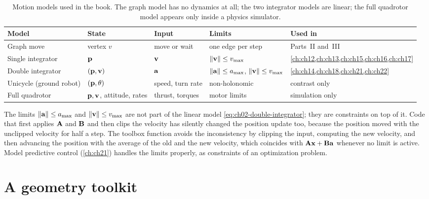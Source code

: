 \begin{table}[tb]
\centering\small
\caption{Motion models used in the book. The graph model has no dynamics at all; the two integrator models are linear; the full quadrotor model appears only inside a physics simulator.}
\label{tab:ch02-motion-models}
\begin{tabularx}{\textwidth}{@{}lllYY@{}}
\toprule
Model & State & Input & Limits & Used in\\
\midrule
Graph move & vertex $v$ & move or wait & one edge per step & Parts~II and~III\\
Single integrator & $\mathbf{p}$ & $\mathbf{v}$ & $\left\lVert \mathbf{v} \right\rVert\le v_{\max}$ & \cref{ch:ch12,ch:ch13,ch:ch15,ch:ch16,ch:ch17}\\
Double integrator & $(\mathbf{p},\mathbf{v})$ & $\mathbf{a}$ & $\left\lVert \mathbf{a} \right\rVert\le a_{\max}$, $\left\lVert \mathbf{v} \right\rVert\le v_{\max}$ & \cref{ch:ch14,ch:ch18,ch:ch21,ch:ch22}\\
Unicycle (ground robot) & $(\mathbf{p},\theta)$ & speed, turn rate & non-holonomic & contrast only\\
Full quadrotor & $\mathbf{p},\mathbf{v}$, attitude, rates & thrust, torques & motor limits & simulation only\\
\bottomrule
\end{tabularx}
\end{table}

\begin{pitfall}
The limits $\left\lVert \mathbf{a} \right\rVert\le a_{\max}$ and $\left\lVert \mathbf{v} \right\rVert\le v_{\max}$ are not part of the linear model \cref{eq:ch02-double-integrator}; they are constraints on top of it. Code that first applies $\mathbf{A}$ and $\mathbf{B}$ and then clips the velocity has silently changed the position update too, because the position moved with the unclipped velocity for half a step. The toolbox function  avoids the inconsistency by clipping the input, computing the new velocity, and then advancing the position with the average of the old and the new velocity, which coincides with $\mathbf{A}\mathbf{x}+\mathbf{B}\mathbf{a}$ whenever no limit is active. Model predictive control (\cref{ch:ch21}) handles the limits properly, as constraints of an optimization problem.
\end{pitfall}

\section{A geometry toolkit}
\label{sec:ch02-geometry}

